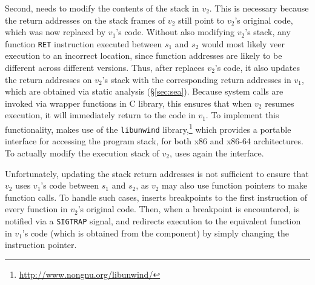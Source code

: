 

Second, \rem needs to modify the contents of the stack in $v_2$.  This is
necessary because the return addresses on the stack frames of $v_2$ still point
to $v_2$'s original code, which was now replaced by $v_1$'s code.  Without also
modifying $v_2$'s stack, any function
\lstinline[language={[x64]Assembler}]`RET` instruction executed between $s_1$
and $s_2$ would most likely veer execution to an incorrect location, since
function addresses are likely to be different across different versions.  Thus,
after \rem replaces $v_2$'s code, it also updates the return addresses on
$v_2$'s stack with the corresponding return addresses in $v_1$, which are
obtained via static analysis (\S\ref{sec:sea}).  Because system calls are
invoked via wrapper functions in C library, this ensures that when $v_2$
resumes execution, it will immediately return to the code in $v_1$.
%
To implement this functionality, \rem makes use of
the \texttt{libunwind}
library,\footnote{\url{http://www.nongnu.org/libunwind/}} which provides a
portable interface for accessing the program stack, for both x86 and
x86-64 architectures. To actually modify the execution stack of
$v_2$, \rem uses again the \ptrace interface.


Unfortunately, updating the stack return addresses is not sufficient
to ensure that $v_2$ uses $v_1$'s code between $s_1$ and $s_2$, as
$v_2$ may also use function pointers to make function calls.
To handle such cases, \rem inserts breakpoints to the first
instruction of every function in $v_2$'s original code.  Then, when a
breakpoint is encountered, \rem is notified via a \lstinline`SIGTRAP`
signal, and redirects execution to the equivalent function in $v_1$'s
code (which is obtained from the \sea component) by simply changing
the instruction pointer.

